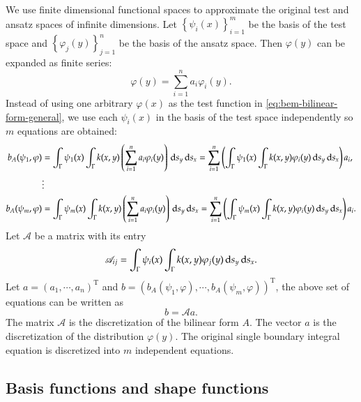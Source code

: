 \documentclass[11pt, a4paper]{article}
\begin{document}
We use finite dimensional functional spaces to approximate the original test and ansatz
spaces of infinite dimensions. Let $\left\{ \psi_i(x) \right\}_{i=1}^m$ be the basis of
the test space and $\left\{ \varphi_j(y) \right\}_{j=1}^n$ be the basis of the ansatz
space. Then $\varphi(y)$ can be expanded as finite series:
\begin{equation}
  \varphi(y) = \sum_{i=1}^n a_i\varphi_i(y).
\end{equation}
Instead of using one arbitrary $\varphi(x)$ as the test function in
\eqref{eq:bem-bilinear-form-general}, we use each $\psi_i(x)$ in the basis of the test
space independently so $m$ equations are obtained:
\begin{equation}
  \begin{aligned}
    b_A(\psi_1,\varphi) &=
    \int_{\Gamma}\psi_1(x)\int_{\Gamma}k(x,y) \left( \sum_{i=1}^na_i\varphi_i(y) \right) \,\mathrm{d} s_y \,\mathrm{d}
    s_x = \sum_{i=1}^n \left( \int_{\Gamma}\psi_1(x)\int_{\Gamma}k(x,y) \varphi_i(y) \,\mathrm{d} s_y
    \,\mathrm{d} s_x  \right) a_i, \\
    &\vdots \\
    b_A(\psi_m,\varphi) &=
    \int_{\Gamma}\psi_m(x)\int_{\Gamma}k(x,y) \left( \sum_{i=1}^na_i\varphi_i(y) \right) \,\mathrm{d} s_y \,\mathrm{d}
    s_x = \sum_{i=1}^n \left( \int_{\Gamma}\psi_m(x)\int_{\Gamma}k(x,y) \varphi_i(y) \,\mathrm{d} s_y
    \,\mathrm{d} s_x  \right) a_i.
  \end{aligned}
\end{equation}
Let $\mathscr{A}$ be a matrix with its entry
\begin{equation}
  \label{eq:bilinear-form-matrix-entry}
  \mathscr{A}_{ij} = \int_{\Gamma} \psi_i(x) \int_{\Gamma} k(x,y)\varphi_j(y) \,\mathrm{d} s_y
  \,\mathrm{d} s_x.
\end{equation}
Let $a=(a_1,\cdots,a_n)^{\mathrm{T}}$ and
$b=(b_A(\psi_1,\varphi),\cdots,b_A(\psi_m,\varphi))^{\mathrm{T}}$, the above set of
equations can be written as
\begin{equation}
  b = \mathscr{A} a.
\end{equation}
The matrix $\mathscr{A}$ is the discretization of the bilinear form $A$. The vector $a$ is
the discretization of the distribution $\varphi(y)$. The original single boundary integral
equation is discretized into $m$ independent equations.

\subsection{Basis functions and shape functions}
\end{document}

